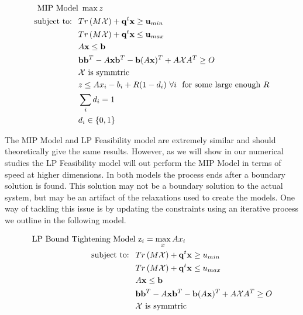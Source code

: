 \documentclass[11pt]{article}
\theoremstyle{plain}
\theoremstyle{definition}
\theoremstyle{remark}
\begin{document}
\begin{subequations}\label{eq:OPTfeasrelaxLP2}
\begin{align}
 \text{MIP Model}& \ \max z  \\
 \text{subject to: } \ &Tr\left(M\mathcal{X}\right)+\bold q^t\bold x \geq \bold u_{min} \\
 & Tr\left(M\mathcal{X}\right)+\bold q^t\bold x \leq \bold u_{max} \\
 	&A\bold x\leq \bold b \\
 	&\bold b\bold b^T-A\bold x\bold b^T-\bold b(A\bold x)^T+A\mathcal{X}A^T\geq O \\
 	&\mathcal{X} \text{ is symmtric} \\
 	& z\leq Ax_i-b_i+R(1-d_i) \ \forall i \ \text{ for some large enough $R$} \\
 	& \sum\limits_i d_i=1 \\
 	& d_i\in\{0,1\}
\end{align}
\end{subequations}

The MIP Model and LP Feasibility model are extremely similar and should theoretically give the same results. 
However, as we will show in our numerical studies the LP Feasibility model will out perform the MIP Model in terms of speed at higher dimensions. 
In both models the process ends after a boundary solution is found. 
This solution may not be a boundary solution to the actual system, but may be an artifact of the relaxations used to create the models. 
One way of tackling this issue is by updating the constraints using an iterative process we outline in the following model.
 
\begin{subequations}\label{eq:OPTfeasrelaxLP3}
\begin{align}
\text{LP Bound Tightening Model}& \ \mathrm{z}_{i} = \max_x Ax_i  \\
 \text{subject to: } \ &Tr\left(M\mathcal{X}\right)+\bold q^t\bold x \geq u_{min} \\
 & Tr\left(M\mathcal{X}\right)+\bold q^t\bold x \leq u_{max} \\
 	&A\bold x\leq \bold b \\
 	&\bold b\bold b^T-A\bold x\bold b^T-\bold b(A\bold x)^T+A\mathcal{X}A^T\geq O \\
 	&\mathcal{X} \text{ is symmtric}
\end{align}
\end{subequations}
\end{document}
